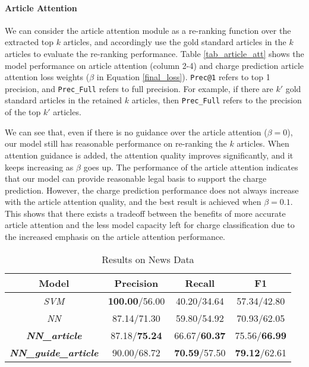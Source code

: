 \paragraph{Article Attention}
We can consider the article attention module as a re-ranking function over the extracted top $k$ articles, and accordingly use the gold standard articles in the $k$ articles to evaluate the re-ranking performance. Table \ref{tab_article_att} shows the model performance on article attention (column 2-4) and charge prediction  article attention loss weights ($\beta$ in Equation \ref{final_loss}). \texttt{Prec@1} refers to top 1 precision, and \texttt{Prec\_Full} refers to full precision. For example, if there are $k'$ gold standard articles in the retained $k$ articles, then \texttt{Prec\_Full} refers to the precision of the top $k'$ articles.

We can see that, even if there is no guidance over the article attention ($\beta=0$), our model still has reasonable performance on re-ranking the $k$ articles. When attention guidance is added, the attention quality improves significantly, and it keeps increasing as $\beta$ goes up.
The  performance of the article attention indicates that our model can provide reasonable legal basis to support the charge prediction.
However, the charge prediction performance does not always increase with the article attention quality, and the best result is achieved when $\beta=0.1$. This shows that there exists a tradeoff between the benefits of more accurate article attention and the less model capacity left for charge classification due to the increased emphasis on the article attention performance.

\begin{table}
\centering
\small{
\begin{tabular}{|c|c|c|c|}
\hline
\textbf{Model}												& \textbf{Precision} 				& \textbf{Recall} 				& \textbf{F1} 	\\
\hline
\textit{SVM} 													& \textbf{100.00}/56.00			& 40.20/34.64  						& 57.34/42.80 				 	\\
\hline
\textit{NN}														& 87.14/71.30								& 59.80/54.92 						& 70.93/62.05					\\
\hline
\textbf{\textit{NN\_article}}					& 87.18/\textbf{75.24}			& 66.67/\textbf{60.37} 		& 75.56/\textbf{66.99}					\\
\hline
\textbf{\textit{NN\_guide\_article}} 	& 90.00/68.72 							& \textbf{70.59}/57.50 		& \textbf{79.12}/62.61 		 	\\
\hline
\end{tabular}
}
\caption{Results on News Data}
\label{tabble_news_results}
\end{table}

